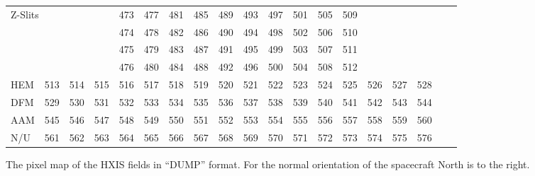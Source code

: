 \begin{figure}
\begin{center}
{\begin{tabular}{*{20}{r}}
\multicolumn{5}{l}{Z-Slits} 
    & 473 & 477 & 481 & 485 & 489 & 493 & 497 & 501 & 505 & 509 \\
&&&&& 474 & 478 & 482 & 486 & 490 & 494 & 498 & 502 & 506 & 510 \\
&&&&& 475 & 479 & 483 & 487 & 491 & 495 & 499 & 503 & 507 & 511 \\
&&&&& 476 & 480 & 484 & 488 & 492 & 496 & 500 & 504 & 508 & 512 \\ \hline
\multicolumn{2}{l}{HEM} & 513 & 514 & 515 & 516 & 517 & 518 & 519 & 520 & 521 &
522 & 523 & 524 & 525 & 526 & 527 & 528 \\
\multicolumn{2}{l}{DFM} & 529 & 530 & 531 & 532 & 533 & 534 & 535 & 536 & 537 &
538 & 539 & 540 & 541 & 542 & 543 & 544 \\
\multicolumn{2}{l}{AAM} & 545 & 546 & 547 & 548 & 549 & 550 & 551 & 552 & 553 &
554 & 555 & 556 & 557 & 558 & 559 & 560 \\
\multicolumn{2}{l}{N/U} & 561 & 562 & 563 & 564 & 565 & 566 & 567 & 568 & 569 &
570 & 571 & 572 & 573 & 574 & 575 & 576 \\ \hline
\end{tabular}}
 \caption{\label{pixelmap} The pixel map of the HXIS fields in ``DUMP'' format.
For the normal orientation of the spacecraft North is to the right.} 
\end{center}
\end{figure}

